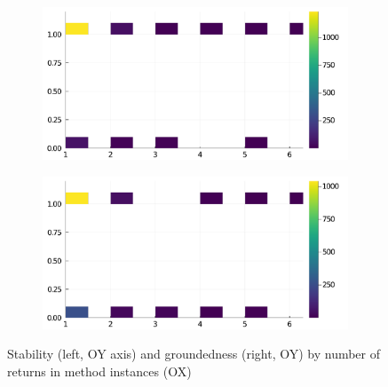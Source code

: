 \begin{figure}[h]
     \begin{subfigure}[b]{0.49\textwidth}
       \includegraphics[width=\textwidth]{figs/all-package-graphs/Genie-returns-vs-stable.pdf}
     \end{subfigure}
     \begin{subfigure}[b]{0.49\textwidth}
       \includegraphics[width=\textwidth]{figs/all-package-graphs/Genie-returns-vs-grounded.pdf}
     \end{subfigure}
\caption{Stability (left, OY axis) and groundedness (right, OY) by number of returns in method instances (OX)}%
%
\label{figs:returns:Genie}
\end{figure}
\clearpage
